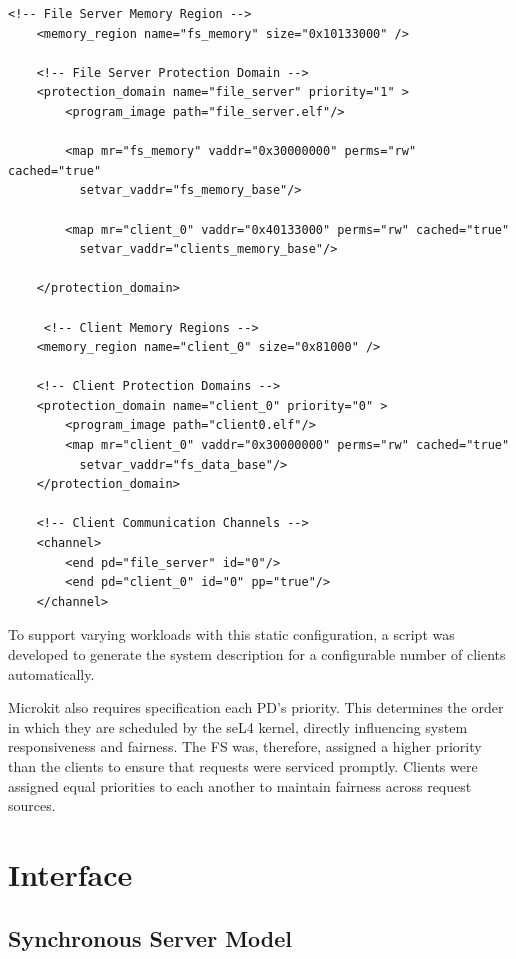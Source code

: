 \newpage
\begin{lstlisting}[caption={Microkit system definition.}, label={lst:system}]
     <!-- File Server Memory Region -->
    <memory_region name="fs_memory" size="0x10133000" />

    <!-- File Server Protection Domain -->
    <protection_domain name="file_server" priority="1" >
        <program_image path="file_server.elf"/>

        <map mr="fs_memory" vaddr="0x30000000" perms="rw" cached="true"
          setvar_vaddr="fs_memory_base"/>
          
        <map mr="client_0" vaddr="0x40133000" perms="rw" cached="true"
          setvar_vaddr="clients_memory_base"/>

    </protection_domain>

     <!-- Client Memory Regions -->
    <memory_region name="client_0" size="0x81000" />

    <!-- Client Protection Domains -->
    <protection_domain name="client_0" priority="0" >
        <program_image path="client0.elf"/>
        <map mr="client_0" vaddr="0x30000000" perms="rw" cached="true"
          setvar_vaddr="fs_data_base"/>
    </protection_domain>

    <!-- Client Communication Channels -->
    <channel>
        <end pd="file_server" id="0"/>
        <end pd="client_0" id="0" pp="true"/>
    </channel>
\end{lstlisting}

To support varying workloads with this static configuration, a script was developed to generate the system description for a configurable number of clients automatically.

Microkit also requires specification each PD's priority. This determines the order in which they are scheduled by the seL4 kernel, directly influencing system responsiveness and fairness. The FS was, therefore, assigned a higher priority than the clients to ensure that requests were serviced promptly. Clients were assigned equal priorities to each another to maintain fairness across request sources. 
\newpage
\section{Interface}

\subsection{Synchronous Server Model}

